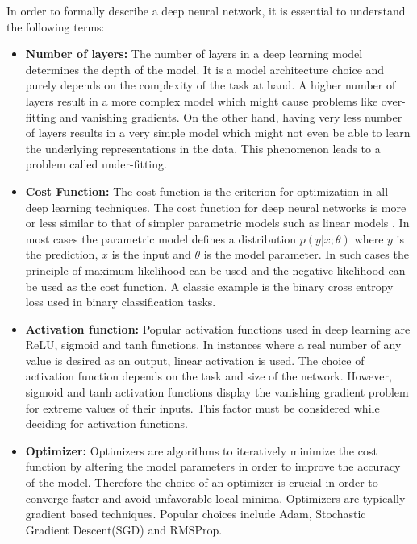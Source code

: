 In order to formally describe a deep neural network, it is essential to understand the following terms:

\begin{itemize}
	\item \textbf{Number of layers:} The number of layers in a deep learning model determines the depth of the model. It is a model architecture choice and purely depends on the complexity of the task at hand. A higher number of layers result in a more complex model which might cause problems like over-fitting and vanishing gradients. On the other hand, having very less number of layers results in a very simple model which might not even be able to learn the underlying representations in the data. This phenomenon leads to a problem called under-fitting. 
	
	\item \textbf{Cost Function:} The cost function is the criterion for optimization in all deep learning techniques. The cost function for deep neural networks is more or less similar to that of simpler parametric models such as linear models \cite{Goodfellow-et-al-2016}. In most cases the parametric model defines a distribution $p(y|x; \theta)$ where $y$ is the prediction, $x$ is the input and $\theta$ is the model parameter. In such cases the principle of maximum likelihood can be used and the negative likelihood can be used as the cost function. A classic example is the binary cross entropy loss used in binary classification tasks.
	
	\item \textbf{Activation function:} Popular activation functions used in deep learning are ReLU, sigmoid and tanh functions. In instances where a real number of any value is desired as an output, linear activation is used. The choice of activation function depends on the task and size of the network. However, sigmoid and tanh activation functions display the vanishing gradient problem for extreme values of their inputs. This factor must be considered while deciding for activation functions.
	
	\item \textbf{Optimizer:} Optimizers are algorithms to  iteratively minimize the cost function by altering the model parameters in order to improve the accuracy of the model. Therefore the choice of an optimizer is crucial in order to converge faster and avoid unfavorable local minima.
	Optimizers are typically gradient based techniques. Popular choices include Adam, Stochastic Gradient Descent(SGD) and RMSProp.
	

\end{itemize}

